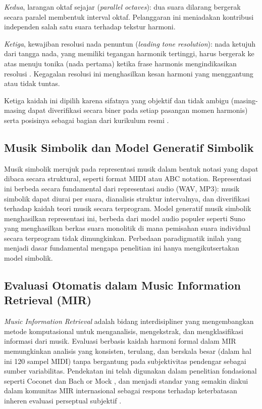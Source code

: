 \textit{Kedua}, larangan oktaf sejajar (\textit{parallel octaves}): dua suara dilarang bergerak secara paralel membentuk interval oktaf. Pelanggaran ini meniadakan kontribusi independen salah satu suara terhadap tekstur harmoni.

\textit{Ketiga}, kewajiban resolusi nada penuntun (\textit{leading tone resolution}): nada ketujuh dari tangga nada, yang memiliki tegangan harmonik tertinggi, harus bergerak ke atas menuju tonika (nada pertama) ketika frase harmonis mengindikasikan resolusi \parencite{schoenberg1954}. Kegagalan resolusi ini menghasilkan kesan harmoni yang menggantung atau tidak tuntas.

Ketiga kaidah ini dipilih karena sifatnya yang objektif dan tidak ambigu (masing-masing dapat diverifikasi secara biner pada setiap pasangan momen harmonis) serta posisinya sebagai bagian dari kurikulum resmi \programstudy{} \institutionname{}.

\subsection{Musik Simbolik dan Model Generatif Simbolik}

Musik simbolik merujuk pada representasi musik dalam bentuk notasi yang dapat dibaca secara struktural, seperti format MIDI atau ABC notation. Representasi ini berbeda secara fundamental dari representasi audio (WAV, MP3): musik simbolik dapat diurai per suara, dianalisis struktur intervalnya, dan diverifikasi terhadap kaidah teori musik secara terprogram. Model generatif musik simbolik menghasilkan representasi ini, berbeda dari model audio populer seperti Suno yang menghasilkan berkas suara monolitik di mana pemisahan suara individual secara terprogram tidak dimungkinkan. Perbedaan paradigmatik inilah yang menjadi dasar fundamental mengapa penelitian ini hanya mengikutsertakan model simbolik.

\subsection{Evaluasi Otomatis dalam Music Information Retrieval (MIR)}

\textit{Music Information Retrieval} adalah bidang interdisipliner yang mengembangkan metode komputasional untuk menganalisis, mengekstrak, dan mengklasifikasi informasi dari musik. Evaluasi berbasis kaidah harmoni formal dalam MIR memungkinkan analisis yang konsisten, terulang, dan berskala besar (dalam hal ini 120 sampel MIDI) tanpa bergantung pada subjektivitas pendengar sebagai sumber variabilitas. Pendekatan ini telah digunakan dalam penelitian fondasional seperti Coconet \parencite{huang2017} dan Bach or Mock \parencite{fang2020}, dan menjadi standar yang semakin diakui dalam komunitas MIR internasional sebagai respons terhadap keterbatasan inheren evaluasi perseptual subjektif \parencite{yang2020, le2025}.
